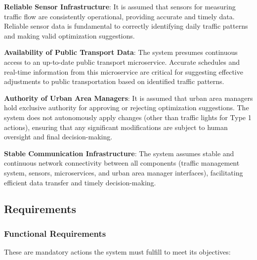 \documentclass[a4paper,12pt]{article}
\begin{document}
\begin{itmeize}

\item \textbf{Reliable Sensor Infrastructure}:
It is assumed that sensors for measuring traffic flow are consistently operational, providing accurate and timely data. Reliable sensor data is fundamental to correctly identifying daily traffic patterns and making valid optimization suggestions.

\item \textbf{Availability of Public Transport Data}:
The system presumes continuous access to an up-to-date public transport microservice. Accurate schedules and real-time information from this microservice are critical for suggesting effective adjustments to public transportation based on identified traffic patterns.

\item \textbf{Authority of Urban Area Managers}:
It is assumed that urban area managers hold exclusive authority for approving or rejecting optimization suggestions. The system does not autonomously apply changes (other than traffic lights for Type 1 actions), ensuring that any significant modifications are subject to human oversight and final decision-making.

\item \textbf{Stable Communication Infrastructure}:
The system assumes stable and continuous network connectivity between all components (traffic management system, sensors, microservices, and urban area manager interfaces), facilitating efficient data transfer and timely decision-making.

\end{itmeize}

\subsection{Requirements}
\subsubsection{Functional Requirements}

These are mandatory actions the system must fulfill to meet its objectives:
\end{document}

